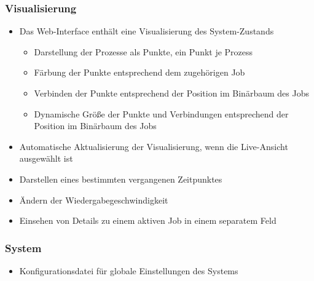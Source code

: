     \subsubsection{Visualisierung}    
        \begin{itemize}[noitemsep]
            \item Das Web-Interface enthält eine Visualisierung des System-Zustands
                \begin{itemize}[noitemsep]
                    \item Darstellung der Prozesse als Punkte, ein Punkt je Prozess %
                    \item Färbung der Punkte entsprechend dem zugehörigen Job
                    \item Verbinden der Punkte entsprechend der Position im Binärbaum des Jobs
                    \item Dynamische Größe der Punkte und Verbindungen entsprechend der Position im Binärbaum des Jobs
                \end{itemize}
            \item Automatische Aktualisierung der Visualisierung, wenn die Live-Ansicht ausgewählt ist
            \item Darstellen eines bestimmten vergangenen Zeitpunktes
            \item Ändern der Wiedergabegeschwindigkeit
            \item Einsehen von Details zu einem aktiven Job in einem separatem Feld 
        \end{itemize}
    
    \subsubsection{System}
        \begin{itemize}[noitemsep]
            \item Konfigurationsdatei für globale Einstellungen des Systems
        \end{itemize}
        
